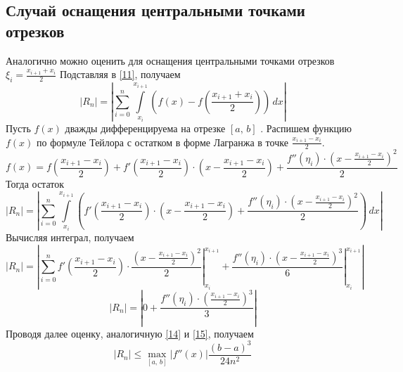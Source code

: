 \documentclass[a4paper, 11pt]{article}
\begin{document}
	\subsection{Случай оснащения центральными точками отрезков}
	Аналогично можно оценить для оснащения центральными точками отрезков $\xi_i = \frac{x_{i+1} + x_i}{2}$
	Подставляя в \ref{11}, получаем
	\begin{equation}\label{key}
		\left|R_n\right| = \left| \sum_{i=0}^n \int\limits_{x_{i}}^{x_{i+1}}\left(f(x) - f\left(\frac{x_{i+1}+x_i}{2}\right)\right) \, dx \right|
	\end{equation}
	Пусть $f(x)$ дважды дифференцируема на отрезке $[a,\,b]$ . Распишем функцию $f(x)$ по формуле Тейлора с остатком в форме Лагранжа в точке $\frac{x_{i+1}-x_i}{2}$.
	\begin{equation}\label{key}
		f(x) = f\left(\frac{x_{i+1} - x_i}{2}\right) + f'\left(\frac{x_{i+1}-x_i}{2}\right) \cdot \left(x - \frac{x_{i+1}-x_i}{2}\right) + \frac{f''\left(\eta_i\right) \cdot \left(x - \frac{x_{i+1}-x_i}{2}\right)^2}{2} 
	\end{equation}
	Тогда остаток 
	\begin{equation}\label{key}
		\left|R_n\right| = \left| \sum_{i=0}^n \int\limits_{x_{i}}^{x_{i+1}} \left( f'\left(\frac{x_{i+1}-x_i}{2}\right) \cdot \left(x - \frac{x_{i+1}-x_i}{2}\right) + \frac{f''\left(\eta_i\right) \cdot \left(x - \frac{x_{i+1}-x_i}{2}\right)^2}{2} \right) \, dx \right|
	\end{equation}
	Вычисляя интеграл, получаем
	\begin{equation}\label{key}
		\left|R_n\right| = \left| \sum_{i=0}^n \left.f'\left(\frac{x_{i+1}-x_i}{2}\right) \cdot \frac{\left(x - \frac{x_{i+1}-x_i}{2}\right)^2}{2} \right|_{x_i}^{x_{i+1}} + \left. \frac{f''\left(\eta_i\right) \cdot \left(x - \frac{x_{i+1}-x_i}{2}\right)^3}{6} \right|_{x_i}^{x_{i+1}} \right|
	\end{equation}
	\begin{equation}\label{key}
		|R_n| = \left| 0 + \frac{f''\left(\eta_i\right) \cdot \left(\frac{x_{i+1}-x_i}{2}\right)^3}{3} \right|
	\end{equation}
	Проводя далее оценку, аналогичную \ref{14} и \ref{15}, получаем
	\begin{equation}\label{22}
		\left|R_n\right| \leqslant \max\limits_{[a,\,b]} \left|f''(x)\right| \frac{(b-a)^3}{24n^2}
	\end{equation}
\end{document}
